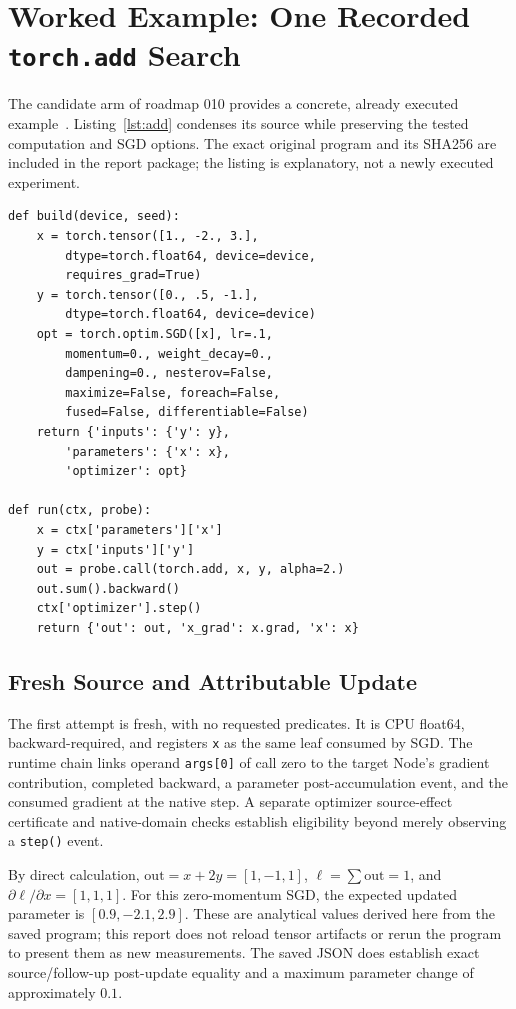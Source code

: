 \documentclass[conference]{IEEEtran}
\begin{document}
\section{Worked Example: One Recorded \texttt{torch.add} Search}
The candidate arm of roadmap 010 provides a concrete, already executed example~\cite{addcase}. Listing~\ref{lst:add} condenses its source while preserving the tested computation and SGD options. The exact original program and its SHA256 are included in the report package; the listing is explanatory, not a newly executed experiment.
\begin{lstlisting}[float=t,captionpos=b,abovecaptionskip=6pt,belowcaptionskip=6pt,caption={Recorded stateful source for torch.add.},label={lst:add}]
def build(device, seed):
    x = torch.tensor([1., -2., 3.],
        dtype=torch.float64, device=device,
        requires_grad=True)
    y = torch.tensor([0., .5, -1.],
        dtype=torch.float64, device=device)
    opt = torch.optim.SGD([x], lr=.1,
        momentum=0., weight_decay=0.,
        dampening=0., nesterov=False,
        maximize=False, foreach=False,
        fused=False, differentiable=False)
    return {'inputs': {'y': y},
        'parameters': {'x': x},
        'optimizer': opt}

def run(ctx, probe):
    x = ctx['parameters']['x']
    y = ctx['inputs']['y']
    out = probe.call(torch.add, x, y, alpha=2.)
    out.sum().backward()
    ctx['optimizer'].step()
    return {'out': out, 'x_grad': x.grad, 'x': x}
\end{lstlisting}

\subsection{Fresh Source and Attributable Update}
The first attempt is fresh, with no requested predicates. It is CPU float64, backward-required, and registers \texttt{x} as the same leaf consumed by SGD. The runtime chain links operand \texttt{args[0]} of call zero to the target Node's gradient contribution, completed backward, a parameter post-accumulation event, and the consumed gradient at the native step. A separate optimizer source-effect certificate and native-domain checks establish eligibility beyond merely observing a \texttt{step()} event.

By direct calculation, $\mathrm{out}=x+2y=[1,-1,1]$, $\ell=\sum\mathrm{out}=1$, and $\partial\ell/\partial x=[1,1,1]$. For this zero-momentum SGD, the expected updated parameter is $[0.9,-2.1,2.9]$. These are analytical values derived here from the saved program; this report does not reload tensor artifacts or rerun the program to present them as new measurements. The saved JSON does establish exact source/follow-up post-update equality and a maximum parameter change of approximately $0.1$.
\end{document}
